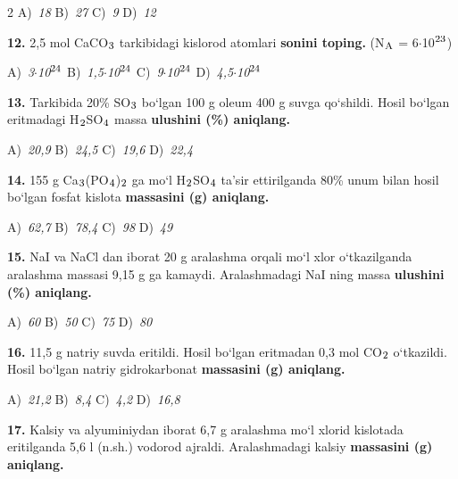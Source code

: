 \documentclass[11pt,a4paper]{article}
\renewcommand{\textsubscript}[1]{\ensuremath{_{\text{\fontsize{8}{8}\selectfont #1}}}}
\renewcommand{\textsuperscript}[1]{\ensuremath{^{\text{\fontsize{8}{8}\selectfont #1}}}}
\begin{document}
\begin{multicols}{2}
\noindent A)~\textsl{18} \hfill B)~\textsl{27} \hfill C)~\textsl{9} \hfill D)~\textsl{12}\par
\vspace{4pt}
\noindent\textbf{12.} 2,5 mol CaCO\textsubscript{3} tarkibidagi kislorod atomlari \textbf{sonini toping.} (N\textsubscript{A} = 6$\cdot$10\textsuperscript{23})

\noindent A)~\textsl{3$\cdot$10\textsuperscript{24}} \hfill B)~\textsl{1,5$\cdot$10\textsuperscript{24}} \hfill C)~\textsl{9$\cdot$10\textsuperscript{24}} \hfill D)~\textsl{4,5$\cdot$10\textsuperscript{24}}\par
\vspace{4pt}
\noindent\textbf{13.} Tarkibida 20\% SO\textsubscript{3} bo`lgan 100 g oleum 400 g suvga qo`shildi. Hosil bo`lgan eritmadagi H\textsubscript{2}SO\textsubscript{4} massa \textbf{ulushini (\%) aniqlang.}

\noindent A)~\textsl{20,9} \hfill B)~\textsl{24,5} \hfill C)~\textsl{19,6} \hfill D)~\textsl{22,4}\par
\vspace{4pt}
\noindent\textbf{14.} 155 g Ca\textsubscript{3}(PO\textsubscript{4})\textsubscript{2} ga mo`l H\textsubscript{2}SO\textsubscript{4} ta'sir ettirilganda 80\% unum bilan hosil bo`lgan fosfat kislota \textbf{massasini (g) aniqlang.}

\noindent A)~\textsl{62,7} \hfill B)~\textsl{78,4} \hfill C)~\textsl{98} \hfill D)~\textsl{49}\par
\vspace{4pt}
\noindent\textbf{15.} NaI va NaCl dan iborat 20 g aralashma orqali mo`l xlor o`tkazilganda aralashma massasi 9,15 g ga kamaydi. Aralashmadagi NaI ning massa \textbf{ulushini (\%) aniqlang.}

\noindent A)~\textsl{60} \hfill B)~\textsl{50} \hfill C)~\textsl{75} \hfill D)~\textsl{80}\par
\vspace{4pt}
\noindent\textbf{16.} 11,5 g natriy suvda eritildi. Hosil bo`lgan eritmadan 0,3 mol CO\textsubscript{2} o`tkazildi. Hosil bo`lgan natriy gidrokarbonat \textbf{massasini (g) aniqlang.}

\noindent A)~\textsl{21,2} \hfill B)~\textsl{8,4} \hfill C)~\textsl{4,2} \hfill D)~\textsl{16,8}\par
\vspace{4pt}
\noindent\textbf{17.} Kalsiy va alyuminiydan iborat 6,7 g aralashma mo`l xlorid kislotada eritilganda 5,6 l (n.sh.) vodorod ajraldi. Aralashmadagi kalsiy \textbf{massasini (g) aniqlang.}


\end{multicols}
\end{document}
